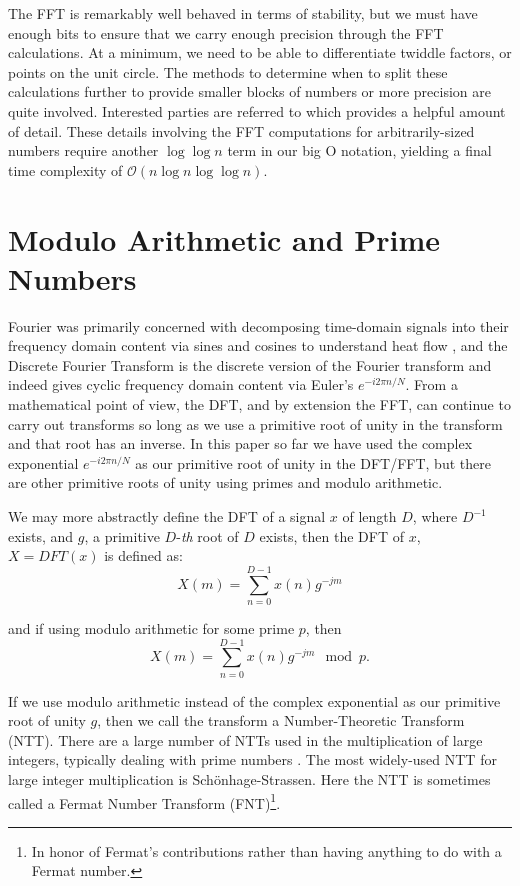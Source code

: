 \documentclass[psamsfonts,reqno]{amsart}
\theoremstyle{definition}
\theoremstyle{remark}
\numberwithin{equation}{section}
\begin{document}
The FFT is remarkably well behaved in terms of stability\cite{higham2002accuracy}, but we must have enough bits to ensure that we carry enough precision through the FFT calculations\cite{proakis1995digital}. At a minimum, we need to be able to differentiate twiddle factors, or points on the unit circle. The methods to determine when to split these calculations further to provide smaller blocks of numbers or more precision are quite involved. Interested parties are referred to \cite{brent2010modern} which provides a helpful amount of detail. These details involving the FFT computations for arbitrarily-sized numbers require another $\log{\log{n}}$ term in our big O notation, yielding a final time complexity of $\mathcal{O}(n \log{n} \log{\log{n}})$\cite{brent2010modern, higham2002accuracy, proakis1995digital}.

\section{Modulo Arithmetic and Prime Numbers}

Fourier was primarily concerned with decomposing time-domain signals into their frequency domain content via sines and cosines to understand heat flow \cite{baron2003analytical}, and the Discrete Fourier Transform is the discrete version of the Fourier transform and indeed gives cyclic frequency domain content via Euler's $e^{-i2 \pi n / N}$. From a mathematical point of view, the DFT, and by extension the FFT, can continue to carry out transforms so long as we use a primitive root of unity in the transform and that root has an inverse. In this paper so far we have used the complex exponential $e^{-i 2 \pi n /N}$ as our primitive root of unity in the DFT/FFT, but there are other primitive roots of unity using primes and modulo arithmetic.

We may more abstractly define the DFT of a signal $x$ of length $D$, where $D^{-1}$ exists, and $g$, a primitive $D$-\textit{th} root of $D$ exists, then the DFT of $x$, $X = DFT(x)$ is defined as:
\begin{equation*}
	X(m) = \sum_{n=0}^{D-1} x(n) g^{-jm}
\end{equation*}

and if using modulo arithmetic for some prime $p$, then 
\begin{equation*}
	X(m) = \sum_{n=0}^{D-1} x(n) g^{-jm} \mod{p}.
\end{equation*}

If we use modulo arithmetic instead of the complex exponential as our primitive root of unity $g$, then we call the transform a Number-Theoretic Transform (NTT). There are a large number of NTTs used in the multiplication of large integers, typically dealing with prime numbers \cite{baron2003analytical, crandall1999integer, crandall2005prime, harvey2021integer, silverman2014friendly, van1992computational}. The most widely-used NTT for large integer multiplication is Sch\"{o}nhage-Strassen. Here the NTT is sometimes called a Fermat Number Transform (FNT)\footnote{In honor of Fermat's contributions rather than having anything to do with a Fermat number.}.
\end{document}
